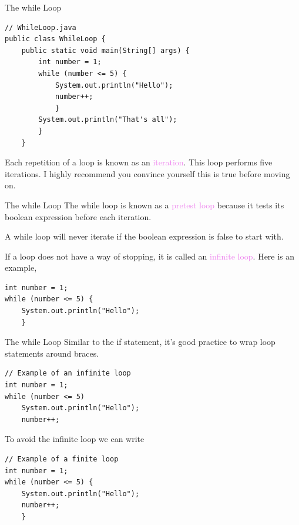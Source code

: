 \documentclass[11pt]{beamer}
\newcommand{\violet}[1]{\textcolor{violet}{#1}}
\begin{document}
\begin{frame}[fragile]{The while Loop}
    \begin{lstlisting}
// WhileLoop.java
public class WhileLoop {
    public static void main(String[] args) {
        int number = 1;
        while (number <= 5) {
            System.out.println("Hello");
            number++;
            }
        System.out.println("That's all");
        }
    }
    \end{lstlisting}
    Each repetition of a loop is known as an \violet{iteration}. This loop performs five iterations. I highly recommend you convince yourself this is true before moving on.
\end{frame}

\begin{frame}[fragile]{The while Loop}
    The while loop is known as a \violet{pretest loop} because it tests its boolean expression before each iteration. \\

    \vspace{1em}

    A while loop will never iterate if the boolean expression is false to start with. \\ 

    \vspace{1em}

    If a loop does not have a way of stopping, it is called an \violet{infinite loop}. Here is an example,
    \begin{lstlisting}
int number = 1;
while (number <= 5) {
    System.out.println("Hello");
    }
    \end{lstlisting}
\end{frame}

\begin{frame}[fragile]{The while Loop}
    Similar to the if statement, it's good practice to wrap loop statements around braces.
    \begin{lstlisting}[basicstyle=\ttfamily\footnotesize]
// Example of an infinite loop
int number = 1;
while (number <= 5) 
    System.out.println("Hello");
    number++;
    \end{lstlisting}
    To avoid the infinite loop we can write
    \begin{lstlisting}[basicstyle=\ttfamily\footnotesize]
// Example of a finite loop
int number = 1;
while (number <= 5) {
    System.out.println("Hello");
    number++;
    }
    \end{lstlisting}
\end{frame}
\end{document}

